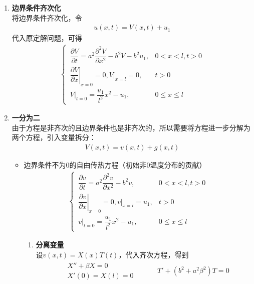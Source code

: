 \solve 
\begin{enumerate}[{\textbf{步骤}}1 ]
	\item  \textbf{边界条件齐次化}\\
	\hspace*{2em} 将边界条件齐次化，令
	\begin{align}
		u(x,t) = V(x, t) + u_1
	\end{align}
	代入原定解问题，可得
	\begin{align}
		\begin{cases}
			\, \dfrac{\partial V}{\partial t} = a^2 \dfrac{\partial^2 V}{\partial x^2} - b^2 V - b^2u_1, & 0<x<l,t>0\\[0.5em]
			\, \left. \dfrac{\partial V}{\partial x}\right|_{x = 0} = 0, V|_{x = l} = 0, &t > 0\\[0.5em]
			\, V|_{t = 0} = \dfrac{u_1}{l^2}x^2 - u_1, &0\le x\le l
		\end{cases}
	\end{align}
	
	\item \textbf{一分为二}\\
	由于方程是非齐次的且边界条件也是非齐次的，所以需要将方程进一步分解为两个方程，引入变量拆分：
	\begin{align}
		V(x,t) = v(x,t) + g(x,t)
	\end{align}
	
	\begin{itemize}
		\item 边界条件不为0的自由传热方程（初始非0温度分布的贡献）
		\begin{align}
			\begin{cases}
				\, \dfrac{\partial v}{\partial t} = a^2 \dfrac{\partial^2 v}{\partial x^2} - b^2 v, &0<x<l,t>0 \\[0.5em]
				\, \left. \dfrac{\partial v}{\partial x} \right|_{x = 0} = 0, v|_{x = l} = u_1, &t>0\\[0.5em]
				\, v|_{t = 0} = \dfrac{u_1}{l^2}x^2 - u_1, &0 \le x \le l
			\end{cases}
		\end{align}
		\begin{enumerate}
			\item \textbf{分离变量}\\
			设$v(x, t) = X(x)T(t)$，代入齐次方程，得到
			\begin{align}
				\begin{aligned}
					& X'' + \beta X = 0\\
					& X'(0) = X(l) = 0
				\end{aligned}
				\quad \quad \quad 
				T' + (b^2 + a^2 \beta^2)T = 0
			\end{align}
			

\end{enumerate}
\end{itemize}
\end{enumerate}
